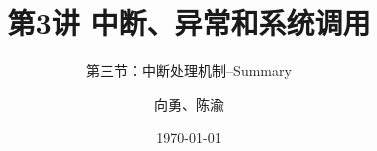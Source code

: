 


\title[第3讲]{第3讲 中断、异常和系统调用} %
\subtitle{第三节：中断处理机制--Summary}
\author{向勇、陈渝} %
\date{\today} %



\begin{frame}
\titlepage %
\end{frame}



